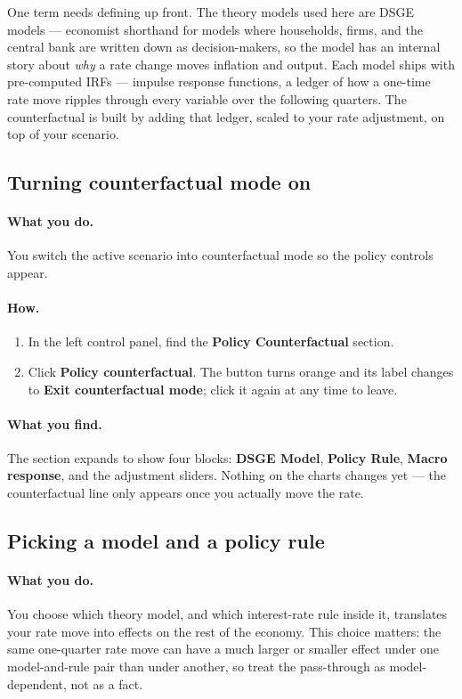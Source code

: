 \documentclass[11pt]{article}
\theoremstyle{definition}
\theoremstyle{remark}
\begin{document}
One term needs defining up front. The theory models used here are DSGE models
--- economist shorthand for models where households, firms, and the central
bank are written down as decision-makers, so the model has an internal story
about \emph{why} a rate change moves inflation and output. Each model ships
with pre-computed IRFs --- impulse response functions, a ledger of how a
one-time rate move ripples through every variable over the following quarters.
The counterfactual is built by adding that ledger, scaled to your rate
adjustment, on top of your scenario.

\subsection{Turning counterfactual mode on}

\paragraph{What you do.} You switch the active scenario into counterfactual
mode so the policy controls appear.

\paragraph{How.}
\begin{enumerate}
  \item In the left control panel, find the \textbf{Policy Counterfactual}
    section.
  \item Click \textbf{Policy counterfactual}. The button turns orange and its
    label changes to \textbf{Exit counterfactual mode}; click it again at any
    time to leave.
\end{enumerate}

\paragraph{What you find.} The section expands to show four blocks:
\textbf{DSGE Model}, \textbf{Policy Rule}, \textbf{Macro response}, and the
adjustment sliders. Nothing on the charts changes yet --- the counterfactual
line only appears once you actually move the rate.

\subsection{Picking a model and a policy rule}

\paragraph{What you do.} You choose which theory model, and which interest-rate
rule inside it, translates your rate move into effects on the rest of the
economy. This choice matters: the same one-quarter rate move can have a much
larger or smaller effect under one model-and-rule pair than under another, so
treat the pass-through as model-dependent, not as a fact.
\end{document}
